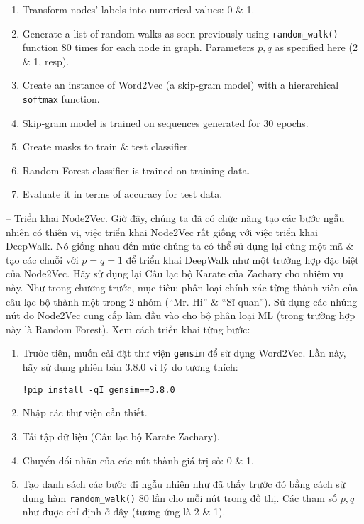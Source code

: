\documentclass{article}
\begin{document}
\begin{itemize}
\begin{itemize}
\begin{enumerate}
            \item Transform nodes' labels into numerical values: 0 \& 1.
            \item Generate a list of random walks as seen previously using \verb|random_walk()| function 80 times for each node in graph. Parameters $p,q$ as specified here (2 \& 1, resp).
            \item Create an instance of Word2Vec (a skip-gram model) with a hierarchical {\tt softmax} function.
            \item Skip-gram model is trained on sequences generated for 30 epochs.
            \item Create masks to train \& test classifier.
            \item Random Forest classifier is trained on training data.
            \item Evaluate it in terms of accuracy for test data.
        \end{enumerate}
        -- {\sf Triển khai Node2Vec.} Giờ đây, chúng ta đã có chức năng tạo các bước ngẫu nhiên có thiên vị, việc triển khai Node2Vec rất giống với việc triển khai DeepWalk. Nó giống nhau đến mức chúng ta có thể sử dụng lại cùng một mã \& tạo các chuỗi với $p = q = 1$ để triển khai DeepWalk như một trường hợp đặc biệt của Node2Vec. Hãy sử dụng lại Câu lạc bộ Karate của Zachary cho nhiệm vụ này. Như trong chương trước, mục tiêu: phân loại chính xác từng thành viên của câu lạc bộ thành một trong 2 nhóm (``Mr. Hi'' \& ``Sĩ quan''). Sử dụng các nhúng nút do Node2Vec cung cấp làm đầu vào cho bộ phân loại ML (trong trường hợp này là Random Forest). Xem cách triển khai từng bước:
        \begin{enumerate}
            \item Trước tiên, muốn cài đặt thư viện {\tt gensim} để sử dụng Word2Vec. Lần này, hãy sử dụng phiên bản 3.8.0 vì lý do tương thích:
            \begin{verbatim}
!pip install -qI gensim==3.8.0
            \end{verbatim}
            \item Nhập các thư viện cần thiết.
            \item Tải tập dữ liệu (Câu lạc bộ Karate Zachary).
            \item Chuyển đổi nhãn của các nút thành giá trị số: 0 \& 1.
            \item Tạo danh sách các bước đi ngẫu nhiên như đã thấy trước đó bằng cách sử dụng hàm \verb|random_walk()| 80 lần cho mỗi nút trong đồ thị. Các tham số $p,q$ như được chỉ định ở đây (tương ứng là 2 \& 1).

\end{enumerate}
\end{itemize}
\end{itemize}
\end{document}
